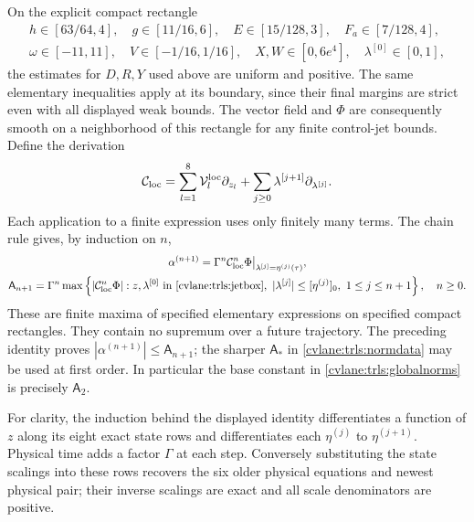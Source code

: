 On the explicit compact rectangle
\begin{equation}\label{cvlane:trls:jetbox}
 \begin{gathered}
 h\in[63/64,4],\quad g\in[11/16,6],\quad
 E\in[15/128,3],\quad F_a\in[7/128,4],\\
 \omega\in[-11,11],\quad V\in[-1/16,1/16],\quad
 X,W\in[0,6e^4],\quad \lambda^{[0]}\in[0,1],
 \end{gathered}
\end{equation}
the estimates for $D,R,Y$ used above are uniform and positive.
The same elementary inequalities apply at its boundary, since their
final margins are strict even with all displayed weak bounds.
The vector field and $\Phi$ are consequently smooth on a
neighborhood of this rectangle for any finite control-jet bounds.
Define the derivation
\begin{equation}\label{cvlane:trls:jetderivation}
 \mathcal C_{\rm loc}
 =\sum_{l=1}^8\mathcal V_l^{\rm loc}
                   \partial_{z_l}
   +\sum_{j\geq0}\lambda^{[j+1]}
                   \partial_{\lambda^{[j]}}.
\end{equation}
Each application to a finite expression uses only finitely many
terms. The chain rule gives, by induction on $n$,
\begin{equation}\label{cvlane:trls:controljets}
 \begin{gathered}
 \alpha^{(n+1)}=
       \Gamma^n\mathcal C_{\rm loc}^n\Phi
       \big|_{\lambda^{[j]}=\eta^{(j)}(\tau)},\\
 \mathsf A_{n+1}=\Gamma^n\max
 \left\{|\mathcal C_{\rm loc}^n\Phi|:
    z,\lambda^{[0]}\text{ in \eqref{cvlane:trls:jetbox}},
    \ |\lambda^{[j]}|\leq[\eta^{(j)}]_0,
                            \ 1\leq j\leq n+1\right\},\quad n\geq0.
 \end{gathered}
\end{equation}
These are finite maxima of specified elementary expressions on
specified compact rectangles. They contain no supremum over a
future trajectory. The preceding identity proves
$|\alpha^{(n+1)}|\leq\mathsf A_{n+1}$; the sharper
$\mathsf A_*$ in \eqref{cvlane:trls:normdata} may be used at first
order. In particular the base constant in
\eqref{cvlane:trls:globalnorms} is precisely $\mathsf A_2$.

For clarity, the induction behind the displayed identity differentiates
a function of $z$ along its eight exact state rows and differentiates
each $\eta^{(j)}$ to $\eta^{(j+1)}$. Physical time
adds a factor $\Gamma$ at each step. Conversely substituting
the state scalings into these rows recovers the six older physical
equations and newest physical pair; their inverse scalings are
exact and all scale denominators are positive.


